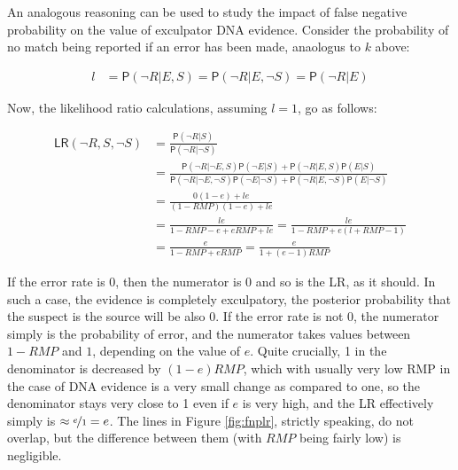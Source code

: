 \documentclass[10pt,dvipsnames,enabledeprecatedfontcommands]{scrartcl}
\newcommand{\n}{\neg}
\newcommand{\pr}[1]{\mathsf{P}(#1)}
\begin{document}
An analogous reasoning can be used to study the impact of false negative
probability on the value of exculpator DNA evidence. Consider the
probability of no match being reported if an error has been made,
anaologus to \(k\) above:

\begin{align*}
l & = \pr{\n R \vert E, S} = \pr{\n R \vert E, \n S} = \pr{\n R\vert E}
\end{align*}

\noindent Now, the likelihood ratio calculations, assuming \(l = 1\), go
as follows:

\begin{align*}
\mathsf{LR}(\n R, S, \n S) & = \frac{\pr{\n R \vert S}}{\pr{\n R \vert \n S}} \\
& = \frac{\pr{\n R \vert \n E, S}\pr{\n E \vert S} + \pr{\n R \vert E, S}\pr{E \vert S}}
{\pr{\n R \vert \n E, \n S}\pr{\n E \vert \n S} + \pr{\n R \vert E,\n S}\pr{E \vert \n S}} \\
& = \frac{0 (1-e) +  le}
{(1-RMP)(1-e) + le} \\
& = \frac{le}
{1- RMP - e + eRMP + le} = \frac{le}{1-RMP + e(l + RMP -1)}\\
& = \frac{e}{1 - RMP + eRMP} = \frac{e}{1+(e-1)RMP}
\end{align*}

\noindent If the error rate is 0, then the numerator is 0 and so is the
\textsf{LR}, as it should. In such a case, the evidence is completely
exculpatory, the posterior probability that the suspect is the source
will be also 0. If the error rate is not 0, the numerator simply is the
probability of error, and the numerator takes values between \(1-RMP\)
and \(1\), depending on the value of \(e\). Quite crucially, 1 in the
denominator is decreased by \((1-e)RMP\), which with usually very low
RMP in the case of DNA evidence is a very small change as compared to
one, so the denominator stays very close to 1 even if \(e\) is very
high, and the \textsf{LR} effectively simply is
\(\approx \nicefrac{e}{1} = e\). The lines in Figure \ref{fig:fnplr},
strictly speaking, do not overlap, but the difference between them (with
\(RMP\) being fairly low) is negligible.
\end{document}
